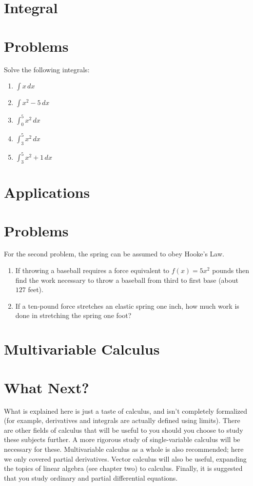 \documentclass{memoir}
\begin{document}
\section{Integral}


\section{Problems}
Solve the following integrals:

\begin{enumerate}
    \item $\int x \, dx$
    \item $\int x^2-5 \, dx$
    \item $\int^5_0 x^2 \, dx$
    \item $\int^5_3 x^2 \, dx$
    \item $\int^5_3 x^2 + 1 \, dx$
\end{enumerate}

\section{Applications}


\section{Problems}
For the second problem, the spring can be assumed to obey Hooke's Law.

\begin{enumerate}
    \item If throwing a baseball requires a force equivalent to $f(x) = 5x^2$ pounds then find the work necessary to throw a baseball from third to first base (about $127$ feet).
    \item If a ten-pound force stretches an elastic spring one inch, how much work is done in stretching the spring one foot?
\end{enumerate}

\section{Multivariable Calculus}

\section{What Next?}
What is explained here is just a taste of calculus, and isn't completely formalized (for example, derivatives and integrals are actually defined using limits). There are other fields of calculus that will be useful to you should you choose to study these subjects further. A more rigorous study of single-variable calculus will be necessary for  these. Multivariable calculus as a whole is also recommended; here we only covered partial derivatives. Vector calculus will also be useful, expanding the topics of linear algebra (see chapter two) to calculus. Finally, it is suggested that you study ordinary and partial differential equations. 
\end{document}
